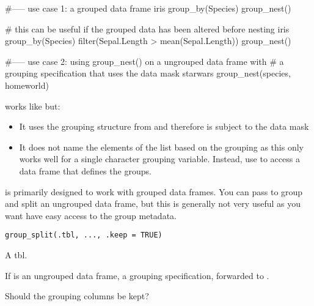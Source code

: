 \documentclass[a4paper]{book}
\begin{document}
%
\begin{Examples}
\begin{ExampleCode}

#----- use case 1: a grouped data frame
iris %
  group_by(Species) %
  group_nest()

# this can be useful if the grouped data has been altered before nesting
iris %
  group_by(Species) %
  filter(Sepal.Length > mean(Sepal.Length)) %
  group_nest()

#----- use case 2: using group_nest() on a ungrouped data frame with
#                  a grouping specification that uses the data mask
starwars %
  group_nest(species, homeworld)
\end{ExampleCode}
\end{Examples}
%
\begin{Description}
\strong{[Experimental]}

 works like  but:
\begin{itemize}

\item{} It uses the grouping structure from  and therefore is subject
to the data mask
\item{} It does not name the elements of the list based on the grouping as this
only works well for a single character grouping variable. Instead,
use  to access a data frame that defines the groups.

\end{itemize}


 is primarily designed to work with grouped data frames.
You can pass  to group and split an ungrouped data frame, but this
is generally not very useful as you want have easy access to the group
metadata.
\end{Description}
%
\begin{Usage}
\begin{verbatim}
group_split(.tbl, ..., .keep = TRUE)
\end{verbatim}
\end{Usage}
%
\begin{Arguments}
\begin{ldescription}
\item[\code{.tbl}] A tbl.

\item[\code{...}] If  is an ungrouped data frame, a grouping specification,
forwarded to .

\item[\code{.keep}] Should the grouping columns be kept?
\end{ldescription}
\end{Arguments}
\end{document}
